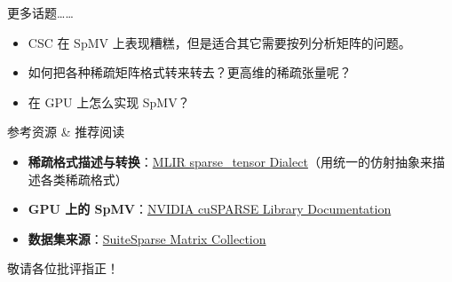 \documentclass{beamer}
\begin{document}
\begin{frame}{更多话题……}
	\begin{itemize}
		\item CSC 在 SpMV 上表现糟糕，但是适合其它需要按列分析矩阵的问题。
		\item 如何把各种稀疏矩阵格式转来转去？更高维的稀疏张量呢？
		\item 在 GPU 上怎么实现 SpMV？
	\end{itemize}
	
\vfill

\begin{block}{参考资源 \& 推荐阅读}
	\footnotesize
	\begin{itemize}
		\item [\faLink] \textbf{稀疏格式描述与转换}：\href{https://mlir.llvm.org/docs/Dialects/SparseTensorOps/}{MLIR sparse\_tensor Dialect}（用统一的仿射抽象来描述各类稀疏格式）
		\item [\faLink] \textbf{GPU 上的 SpMV}：\href{https://developer.nvidia.com/cusparse}{NVIDIA cuSPARSE Library Documentation}
		\item [\faLink] \textbf{数据集来源}：\href{https://sparse.tamu.edu/}{SuiteSparse Matrix Collection}
	\end{itemize}
\end{block}
\end{frame}

	\begin{frame}
		\begin{center}
			\Large{敬请各位批评指正！}
		\end{center}
	\end{frame}
	
\end{document}
